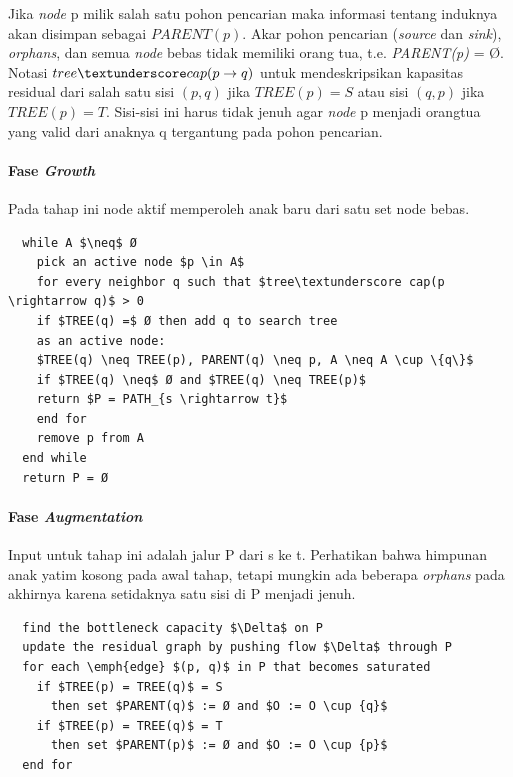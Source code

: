 Jika \emph{node} p milik salah satu pohon pencarian maka informasi tentang induknya 
akan disimpan sebagai \(PARENT(p)\). Akar pohon pencarian (\emph{source} dan \emph{sink}), 
\emph{orphans}, dan semua \emph{node} bebas tidak memiliki orang tua, 
t.e. \emph{PARENT(p)} = Ø. Notasi \(tree\textunderscore cap(p \rightarrow q)\) 
untuk mendeskripsikan kapasitas residual dari salah satu sisi \((p, q)\) jika \(TREE(p) = S\) 
atau sisi \((q, p)\) jika \(TREE(p) = T\). Sisi-sisi ini harus tidak jenuh agar 
\emph{node} p menjadi orangtua yang valid dari anaknya q tergantung pada pohon pencarian.

\paragraph{Fase \emph{Growth}} \label{fase_growth}

Pada tahap ini node aktif memperoleh anak baru dari satu set node bebas.

\begin{lstlisting}
  while A $\neq$ Ø
    pick an active node $p \in A$
    for every neighbor q such that $tree\textunderscore cap(p \rightarrow q)$ > 0
    if $TREE(q) =$ Ø then add q to search tree 
    as an active node:
    $TREE(q) \neq TREE(p), PARENT(q) \neq p, A \neq A \cup \{q\}$
    if $TREE(q) \neq$ Ø and $TREE(q) \neq TREE(p)$ 
    return $P = PATH_{s \rightarrow t}$
    end for
    remove p from A
  end while
  return P = Ø
\end{lstlisting}


\paragraph{Fase \emph{Augmentation}} \label{fase_augmentation}

Input untuk tahap ini adalah jalur P dari s ke t. Perhatikan bahwa himpunan anak 
yatim kosong pada awal tahap, tetapi mungkin ada beberapa \emph{orphans} pada akhirnya 
karena setidaknya satu sisi di P menjadi jenuh.

\begin{lstlisting}
  find the bottleneck capacity $\Delta$ on P
  update the residual graph by pushing flow $\Delta$ through P
  for each \emph{edge} $(p, q)$ in P that becomes saturated
    if $TREE(p) = TREE(q)$ = S 
      then set $PARENT(q)$ := Ø and $O := O \cup {q}$
    if $TREE(p) = TREE(q)$ = T 
      then set $PARENT(p)$ := Ø and $O := O \cup {p}$
  end for
\end{lstlisting}


